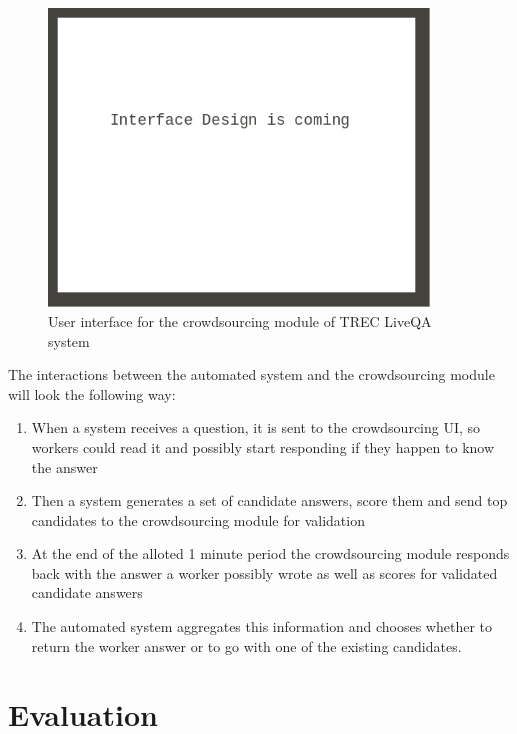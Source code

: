 \begin{figure}[t]
\centering
\includegraphics[width=0.9\textwidth]{img/nonfactoid_crowd_interface}
\caption{User interface for the crowdsourcing module of TREC LiveQA system}
\label{fig:non-factoid:crowd:proposed:interface}
\end{figure}

The interactions between the automated system and the crowdsourcing module will look the following way:
\begin{enumerate}
\item When a system receives a question, it is sent to the crowdsourcing UI, so workers could read it and possibly start responding if they happen to know the answer
\item Then a system generates a set of candidate answers, score them and send top candidates to the crowdsourcing module for validation
\item At the end of the alloted 1 minute period the crowdsourcing module responds back with the answer a worker possibly wrote as well as scores for validated candidate answers
\item The automated system aggregates this information and chooses whether to return the worker answer or to go with one of the existing candidates.
\end{enumerate}

\section{Evaluation}
\label{sec:non-factoid:architecture:evaluation}


